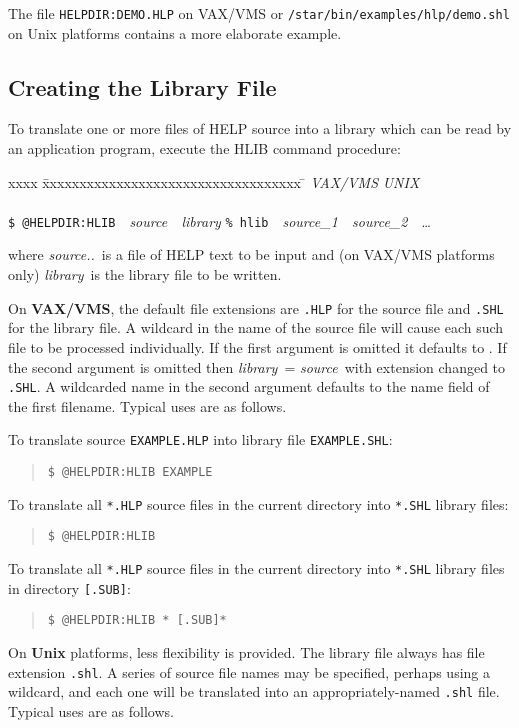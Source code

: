 The file \verb|HELPDIR:DEMO.HLP| on VAX/VMS or
\verb|/star/bin/examples/hlp/demo.shl| on Unix platforms
contains a more elaborate example.

\subsection{Creating the Library File}
To translate one or more files of HELP source into a library which can be
read by an application program, execute the HLIB command procedure:
\begin{tabbing}
xxxx \= xxxxxxxxxxxxxxxxxxxxxxxxxxxxxxxxxxx \= \kill
\> {\it VAX/VMS} \> {\it UNIX} \\ \\
\> \verb|$ @HELPDIR:HLIB|~~{\it source~~library} \>
   \verb|% hlib|~~{\it source\_1~~source\_2}~~\ldots
\end{tabbing}
where {\it source..}\ is a file of HELP text to be
input and (on VAX/VMS
platforms only) {\it library}\, is the library file to be written.

On {\bf VAX/VMS}, the default file extensions are \verb|.HLP| for the
source file and \verb|.SHL| for the library file.  A wildcard in the name
of the source file will cause each such file to be processed
individually.  If the first argument is omitted it defaults to
\fstring{*}.  If the second argument is omitted then
{\it library}\, = {\it source}\, with
extension changed to \verb|.SHL|.  A wildcarded name in the second argument
defaults to the name field of the first filename.  Typical uses are
as follows.

To translate source \verb|EXAMPLE.HLP| into library file \verb|EXAMPLE.SHL|:
\begin{verse}
\verb|$ @HELPDIR:HLIB EXAMPLE|
\end{verse}
To translate all \verb|*.HLP| source files in the current directory
into \verb|*.SHL| library files:
\begin{verse}
\verb|$ @HELPDIR:HLIB|
\end{verse}
To translate all \verb|*.HLP| source files in the current directory into
\verb|*.SHL| library files in directory \verb|[.SUB]|:
\begin{verse}
\verb|$ @HELPDIR:HLIB * [.SUB]*|
\end{verse}

On {\bf Unix} platforms, less flexibility is provided.  The library
file always has file extension \verb|.shl|.  A series of source file names
may be specified, perhaps using a wildcard, and each one will be
translated into an appropriately-named \verb|.shl| file.  Typical uses are
as follows.

